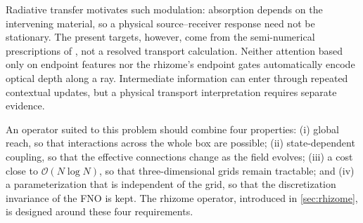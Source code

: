 Radiative transfer motivates such modulation: absorption depends on the intervening material, so a physical source--receiver response need not be stationary. The present targets, however, come from the semi-numerical prescriptions of \cmfast{}, not a resolved transport calculation. Neither attention based only on endpoint features nor the rhizome's endpoint gates automatically encode optical depth along a ray. Intermediate information can enter through repeated contextual updates, but a physical transport interpretation requires separate evidence.

An operator suited to this problem should combine four properties: (i) global reach, so that interactions across the whole box are possible; (ii) state-dependent coupling, so that the effective connections change as the field evolves; (iii) a cost close to $\mathcal{O}(N\log N)$, so that three-dimensional grids remain tractable; and (iv) a parameterization that is independent of the grid, so that the discretization invariance of the FNO is kept. The rhizome operator, introduced in \cref{sec:rhizome}, is designed around these four requirements.
